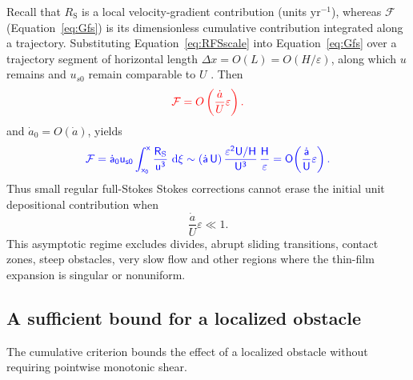 \documentclass[review]{igs}
\providecommand{\DIFadd}[1]{{\protect\color{blue} \sf #1}} %
\providecommand{\DIFdel}[1]{{\protect\color{red} \scriptsize #1}} %
\providecommand{\DIFaddbegin}{} %
\providecommand{\DIFaddend}{} %
\providecommand{\DIFdelbegin}{} %
\providecommand{\DIFdelend}{} %
\newcommand{\DIFscaledelfig}{0.5}
\newlength{\DIFdelgraphicswidth} %
\newlength{\DIFdelgraphicsheight} %
\newcommand{\DIFaddincludegraphics}[2][]{{\color{blue}\fbox{\DIFOincludegraphics[#1]{#2}}}} %
\newcommand{\DIFdelincludegraphics}[2][]{%
\sbox{\DIFdelgraphicsbox}{\DIFOincludegraphics[#1]{#2}}%
\settoboxwidth{\DIFdelgraphicswidth}{\DIFdelgraphicsbox} %
\settoboxtotalheight{\DIFdelgraphicsheight}{\DIFdelgraphicsbox} %
\scalebox{\DIFscaledelfig}{%
\parbox[b]{\DIFdelgraphicswidth}{\usebox{\DIFdelgraphicsbox}\\[-\baselineskip] \rule{\DIFdelgraphicswidth}{0em}}\llap{\resizebox{\DIFdelgraphicswidth}{\DIFdelgraphicsheight}{%
\setlength{\unitlength}{\DIFdelgraphicswidth}%
\begin{picture}(1,1)%
\thicklines\linethickness{2pt} %
{\color[rgb]{1,0,0}\put(0,0){\framebox(1,1){}}}%
{\color[rgb]{1,0,0}\put(0,0){\line( 1,1){1}}}%
{\color[rgb]{1,0,0}\put(0,1){\line(1,-1){1}}}%
\end{picture}%
}\hspace*{3pt}}} %
} %
\DeclareRobustCommand{\DIFaddbegin}{\DIFOaddbegin \let\includegraphics\DIFaddincludegraphics} %
\DeclareRobustCommand{\DIFaddend}{\DIFOaddend \let\includegraphics\DIFOincludegraphics} %
\DeclareRobustCommand{\DIFdelbegin}{\DIFOdelbegin \let\includegraphics\DIFdelincludegraphics} %
\DeclareRobustCommand{\DIFdelend}{\DIFOaddend \let\includegraphics\DIFOincludegraphics} %
\begin{document}
\DIFadd{Recall that \(R_{\mathrm{S}}\) is a local velocity-gradient contribution (units \(\mathrm{yr^{-1}}\)), whereas \(\mathcal{F}\) (Equation~\ref{eq:Gfs}) is its dimensionless cumulative contribution integrated along a trajectory. Substituting Equation~\ref{eq:RFSscale} into Equation~\ref{eq:Gfs} over a trajectory segment of horizontal length \(\Delta x=O(L)=O(H/\varepsilon)\), along which }\DIFaddend \(u\) \DIFdelbegin \DIFdel{remains }\DIFdelend \DIFaddbegin \DIFadd{and \(u_{s0}\) remain }\DIFaddend comparable to \(U\) \DIFdelbegin \DIFdel{. Then
}\begin{displaymath}
\DIFdel{\mathcal{F}=O\left(\frac{\dot a}{U}\varepsilon\right).
}\end{displaymath}%
\DIFdelend \DIFaddbegin \DIFadd{and \(\dot a_0=O(\dot a)\), yields
}\begin{equation}
\DIFadd{\mathcal{F}
=\dot a_0u_{s0}\int_{x_0}^{x}\frac{R_{\mathrm{S}}}{u^3}\,\mathop{}\!\mathrm{d}\xi
\sim (\dot a\,U)\,\frac{\varepsilon^2 U/H}{U^3}\,\frac{H}{\varepsilon}
=O\!\left(\frac{\dot a}{U}\varepsilon\right).
\label{eq:GFSscale}
}\end{equation}\DIFaddend 
Thus small regular \DIFdelbegin \DIFdel{full-Stokes }\DIFdelend \DIFaddbegin \DIFadd{Stokes }\DIFaddend corrections cannot erase the \DIFdelbegin \DIFdel{initial }\DIFdelend \DIFaddbegin \DIFadd{unit }\DIFaddend depositional contribution when
\begin{equation}
\frac{\dot a}{U}\varepsilon\ll1.
\label{eq:thinorder}
\end{equation}
This asymptotic regime excludes divides, abrupt sliding transitions, contact zones, steep obstacles, very slow flow and other regions where the thin-film expansion is singular or nonuniform.

\subsection{A sufficient bound for a localized obstacle}

The cumulative criterion bounds the effect of a localized obstacle without requiring pointwise monotonic shear.
\end{document}
